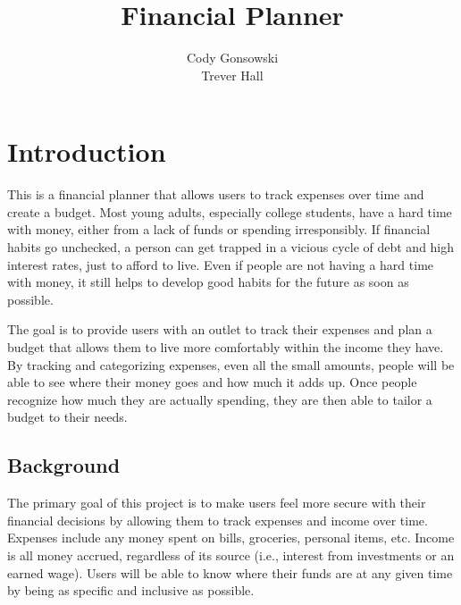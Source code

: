 \documentclass[10pt,conference,onecolumn,compsoc]{IEEEtran}
\begin{document}
\title{Financial Planner}

\author{Cody Gonsowski\\ Trever Hall}%



\maketitle


\IEEEdisplaynontitleabstractindextext
\IEEEpeerreviewmaketitle


\section{Introduction}

This is a financial planner that allows users to track expenses over time and create a budget. Most young adults, especially college students, have a hard time with money, either from a lack of funds or spending irresponsibly. If financial habits go unchecked, a person can get trapped in a vicious cycle of debt and high interest rates, just to afford to live. Even if people are not having a hard time with money, it still helps to develop good habits for the future as soon as possible.

The goal is to provide users with an outlet to track their expenses and plan a budget that allows them to live more comfortably within the income they have. By tracking and categorizing expenses, even all the small amounts, people will be able to see where their money goes and how much it adds up. Once people recognize how much they are actually spending, they are then able to tailor a budget to their needs.


\subsection{Background}
The primary goal of this project is to make users feel more secure with their financial decisions by allowing them to track expenses and income over time.  Expenses include any money spent on bills, groceries, personal items, etc. Income is all money accrued, regardless of its source (i.e., interest from investments or an earned wage). Users will be able to know where their funds are at any given time by being as specific and inclusive as possible.
\end{document}
